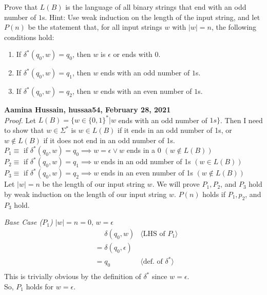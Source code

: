 \documentclass[11pt,fleqn]{article}
\newcommand{\be}{\begin{enumerate}}
\newcommand{\ee}{\end{enumerate}}
\newcommand{\pnote}[1]{\langle \mbox{#1} \rangle}
\begin{document}
   Prove that $L(B)$ is the language of all binary strings that end
   with an odd number of $1$s.  Hint: Use weak induction on the length
   of the input string, and let $P(n)$ be the statement that, for all
   input strings $w$ with $|w| = n$, the following conditions hold:

   \be

     \item If $\delta^*(q_0,w) = q_0$, then $w$ is $\epsilon$ or ends
       with $0$.

     \item If $\delta^*(q_0,w) = q_1$, then $w$ ends with an odd
       number of $1$s.

     \item If $\delta^*(q_0,w) = q_2$, then $w$ ends
       with an even number of $1$s.

   \ee
	
   \textbf{Aamina Hussain, hussaa54, February 28, 2021}\\
   
   \emph{Proof.} Let $L(B) = \{w \in \{0, 1\}^* | w$ ends with an odd number of $1s\}$. Then I need to show that $w \in \Sigma^*$ is $w \in L(B)$ if it ends in an odd number of 1s, or $w \notin L(B)$ if it does not end in an odd number of 1s.\\
   
   $P_1 \equiv$ if $\delta^*(q_0, w) = q_0 \implies w = \epsilon \lor w$ ends in a 0 $(w \notin L(B))$\\
   $P_2 \equiv$ if $\delta^*(q_0, w) = q_1 \implies w$ ends in an odd number of 1s $(w \in L(B))$\\
   $P_3 \equiv$ if $\delta^*(q_0, w) = q_2 \implies w$ ends in an even number of 1s $(w \notin L(B))$\\

   Let $|w| = n$ be the length of our input string $w$. We will prove $P_1, P_2$, and $P_3$ hold by weak induction on the length of our input string $w$. $P(n)$ holds if $P_1, p_2$, and $P_3$ hold.

    \emph{Base Case ($P_1$)} $|w| = n = 0$, $w = \epsilon$
    \begin{align*}
      &\phantom{{}=} \delta(q_0, w) & \pnote{LHS of $P_1$}\\
      &= \delta(q_0, \epsilon) \\
      &= q_0       & \pnote{def. of $\delta^*$}\\
    \end{align*}
    This is trivially obvious by the definition of $\delta^*$ since $w = \epsilon$.\\
    So, $P_1$ holds for $w = \epsilon$.
\end{document}
